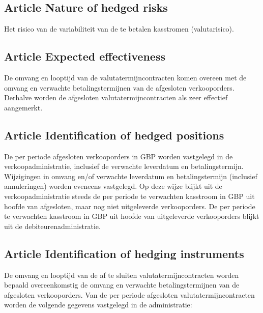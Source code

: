 \subsection*{Article \theartikel \hspace{1em} Nature of hedged risks}
Het risico van de variabiliteit van de te betalen kasstromen (valutarisico).


\subsection*{Article \theartikel \hspace{1em} Expected effectiveness}
De omvang en looptijd van de valutatermijncontracten komen overeen met de omvang en verwachte betalingstermijnen van de afgesloten verkooporders. Derhalve worden de afgesloten valutatermijncontracten als zeer effectief aangemerkt.

\subsection*{Article \theartikel \hspace{1em} Identification of hedged positions}
De per periode afgesloten verkooporders in GBP worden vastgelegd in de verkoopadministratie, inclusief de verwachte leverdatum en betalingstermijn. Wijzigingen in omvang en/of verwachte leverdatum en betalingstermijn (inclusief annuleringen) worden eveneens vastgelegd. Op deze wijze blijkt uit de verkoopadministratie steeds de per periode te verwachten kasstroom in GBP uit hoofde van afgesloten, maar nog niet uitgeleverde verkooporders. De per periode te verwachten kasstroom in GBP uit hoofde van uitgeleverde verkooporders blijkt uit de debiteurenadministratie.


\subsection*{Article \theartikel \hspace{1em} Identification of hedging instruments}
De omvang en looptijd van de af te sluiten valutatermijncontracten worden bepaald overeenkomstig de omvang en verwachte betalingstermijnen van de
afgesloten verkooporders. Van de per periode afgesloten valutatermijncontracten worden de volgende gegevens vastgelegd in de administratie:

